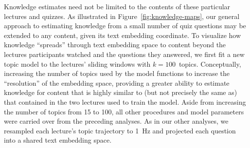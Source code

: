 \documentclass[10pt]{article}
\begin{document}
Knowledge estimates need not be limited to the contents of these particular
lectures and quizzes. As illustrated in Figure~\ref{fig:knowledge-maps}, our
general approach to estimating knowledge from a small number of quiz questions
may be extended to any content, given its text embedding coordinate. To
visualize how knowledge ``spreads'' through text embedding space to content
beyond the lectures participants watched and the questions they answered, we
first fit a new topic model to the lectures' sliding windows with $k =
100$~topics. Conceptually, increasing the number of topics used by the model
functions to increase the ``resolution'' of the embedding space, providing a
greater ability to estimate knowledge for content that is highly similar to (but
not precisely the same as) that contained in the two lectures used to train the
model. Aside from increasing the number of topics from 15 to 100, all other procedures
and model parameters were carried over from the preceding analyses. As in our
other analyses, we resampled each lecture's topic trajectory to 1~Hz and
projected each question into a shared text embedding space.
\end{document}
